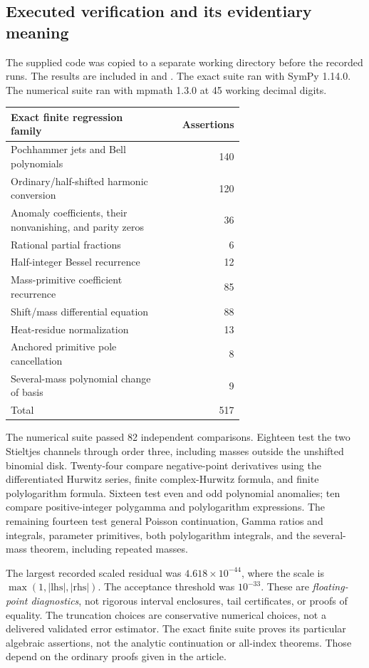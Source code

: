 \subsection{Executed verification and its evidentiary meaning}
The supplied code was copied to a separate working directory before the
recorded runs. The results are included in
 and .
The exact suite ran with SymPy 1.14.0. The numerical suite ran with
mpmath 1.3.0 at 45 working decimal digits.

\begin{center}
\begin{tabular}{@{}p{0.65\linewidth}r@{}}
\toprule
Exact finite regression family & Assertions\\
\midrule
Pochhammer jets and Bell polynomials & 140\\
Ordinary/half-shifted harmonic conversion & 120\\
Anomaly coefficients, their nonvanishing, and parity zeros & 36\\
Rational partial fractions & 6\\
Half-integer Bessel recurrence & 12\\
Mass-primitive coefficient recurrence & 85\\
Shift/mass differential equation & 88\\
Heat-residue normalization & 13\\
Anchored primitive pole cancellation & 8\\
Several-mass polynomial change of basis & 9\\
\midrule
Total & 517\\
\bottomrule
\end{tabular}
\end{center}

The numerical suite passed 82 independent comparisons. Eighteen test the
two Stieltjes channels through order three, including masses outside the
unshifted binomial disk. Twenty-four compare negative-point derivatives
using the differentiated Hurwitz series, finite complex-Hurwitz formula,
and finite polylogarithm formula. Sixteen test even and odd polynomial
anomalies; ten compare positive-integer polygamma and polylogarithm
expressions. The remaining fourteen test general Poisson continuation,
Gamma ratios and integrals, parameter primitives, both polylogarithm
integrals, and the several-mass theorem, including repeated masses.

The largest recorded scaled residual was
$4.618\times10^{-44}$, where the scale is
$\max(1,|\mathrm{lhs}|,|\mathrm{rhs}|)$. The acceptance threshold was
$10^{-33}$. These are \emph{floating-point diagnostics}, not rigorous
interval enclosures, tail certificates, or proofs of equality. The
truncation choices are conservative numerical choices, not a delivered
validated error estimator. The exact finite suite proves its particular
algebraic assertions, not the analytic continuation or all-index theorems.
Those depend on the ordinary proofs given in the article.


